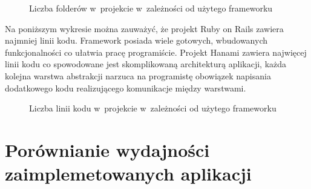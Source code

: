 \documentclass[printmode]{mgr}
\begin{document}
\begin{figure}[H]
  \centering
  \caption{Liczba folderów w~projekcie w~zależności od użytego frameworku}
  \label{fig:folders_count}
\end{figure}

Na poniższym wykresie można zauważyć, że projekt Ruby on Rails zawiera najmniej linii kodu. Framework posiada wiele gotowych, wbudowanych funkcjonalności co ułatwia pracę programiście. Projekt Hanami zawiera najwięcej linii kodu co spowodowane jest skomplikowaną architekturą aplikacji, każda kolejna warstwa abstrakcji narzuca na programistę obowiązek napisania dodatkowego kodu realizującego komunikacje między warstwami.

\begin{figure}[H]
  \centering
  \caption{Liczba linii kodu w~projekcie w~zależności od użytego frameworku}
  \label{fig:code_lines_count}
\end{figure}

\newpage
\section{Porównianie  wydajności zaimplemetowanych aplikacji}
\end{document}
